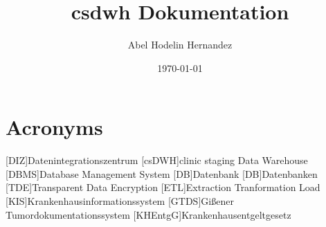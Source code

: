 \documentclass[12pt, a4paper]{report}
\title{\ac{csdwh} Dokumentation}
\author{Abel Hodelin Hernandez}
\date{\today}
\begin{document}
    	\begin{titlepage}
    		\maketitle	
    	\end{titlepage}
    	\section*{Acronyms}
    \begin{acronym}[CDW]
    	[DIZ]{Datenintegrationszentrum}
    	[csDWH]{clinic staging Data Warehouse}
    	[DBMS]{Database Management System}
    	[DB]{Datenbank}
    	[DB]{Datenbanken}
    	[TDE]{Transparent Data Encryption}
    	[ETL]{Extraction Tranformation Load}
    	[KIS]{Krankenhausinformationssystem}
    	[GTDS]{Gißener Tumordokumentationssystem}
    	[KHEntgG]{Krankenhausentgeltgesetz}
    \end{acronym}    
    \clearpage
    \tableofcontents{}
  
  
  
  
  
    
    
\end{document}
